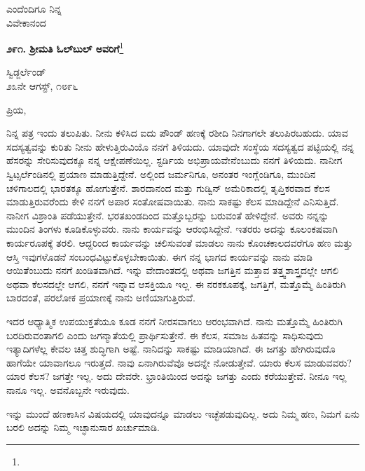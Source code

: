 \vspace{-0.4cm}

{\flushright
ಎಂದೆಂದಿಗೂ ನಿನ್ನ\\ವಿವೇಕಾನಂದ\par}

\begin{center}
\textbf{೨೯೧. ಶ‍್ರೀಮತಿ ಓಲ್‌ಬುಲ್‌ ಅವರಿಗೆ}\footnote{}
\end{center}

\vspace{-0.5cm}

\begin{flushright}
ಸ್ವಿಡ್ಜರ್ಲೆಂಡ್\\೨೩ನೇ ಆಗಸ್ಟ್, ೧೮೯೬
\end{flushright}

\noindent
ಪ್ರಿಯ,

ನಿನ್ನ ಪತ್ರ ಇಂದು ತಲುಪಿತು. ನೀನು ಕಳಿಸಿದ ಐದು ಪೌಂಡ್ ಹಣಕ್ಕೆ ರಶೀದಿ ನಿನಗಾಗಲೇ ತಲುಪಿರಬಹುದು. ಯಾವ ಸದಸ್ಯತ್ವವನ್ನು ಕುರಿತು ನೀನು ಹೇಳುತ್ತಿರುವಿಯೊ ನನಗೆ ತಿಳಿಯದು. ಯಾವುದೇ ಸಂಸ್ಥೆಯ ಸದಸ್ಯತ್ವದ ಪಟ್ಟಿಯಲ್ಲಿ ನನ್ನ ಹೆಸರನ್ನು ಸೇರಿಸುವುದಕ್ಕೂ ನನ್ನ ಆಕ್ಷೇಪಣೆಯಿಲ್ಲ. ಸ್ಟರ್ಡಿಯ ಅಭಿಪ್ರಾಯವೇನೆಂಬುದು ನನಗೆ ತಿಳಿಯದು. ನಾನೀಗ ಸ್ವಿಟ್ಸರ್ಲೆಂಡಿನಲ್ಲಿ ಪ್ರಯಾಣ ಮಾಡುತ್ತಿದ್ದೇನೆ. ಅಲ್ಲಿಂದ ಜರ್ಮನಿಗೂ, ಅನಂತರ ಇಂಗ್ಲೆಂಡಿಗೂ, ಮುಂದಿನ ಚಳಿಗಾಲದಲ್ಲಿ ಭಾರತಕ್ಕೂ ಹೋಗುತ್ತೇನೆ. ಶಾರದಾನಂದ ಮತ್ತು ಗುಡ್ವಿನ್ ಅಮೆರಿಕಾದಲ್ಲಿ ತೃಪ್ತಿಕರವಾದ ಕೆಲಸ ಮಾಡುತ್ತಿರುವರೆಂದು ಕೇಳಿ ನನಗೆ ಅಪಾರ ಸಂತೋಷವಾಯಿತು. ನಾನು ಸಾಕಷ್ಟು ಕೆಲಸ ಮಾಡಿದ್ದೇನೆ ಎನಿಸುತ್ತಿದೆ. ನಾನೀಗ ವಿಶ್ರಾಂತಿ ಪಡೆಯುತ್ತೇನೆ. ಭರತಖಂಡದಿಂದ ಮತ್ತೊಬ್ಬರನ್ನು ಬರುವಂತೆ ಹೇಳಿದ್ದೇನೆ. ಅವರು ನನ್ನನ್ನು ಮುಂದಿನ ತಿಂಗಳು ಕೂಡಿಕೊಳ್ಳುವರು. ನಾನು ಕಾರ್ಯವನ್ನು ಆರಂಭಿಸಿದ್ದೇನೆ. ಇತರರು ಅದನ್ನು ಕೂಲಂಕಷವಾಗಿ ಕಾರ್ಯರೂಪಕ್ಕೆ ತರಲಿ. ಆದ್ದರಿಂದ ಕಾರ್ಯವನ್ನು ಚಲಿಸುವಂತೆ ಮಾಡಲು ನಾನು ಕೊಂಚಕಾಲದವರೆಗೂ ಹಣ ಮತ್ತು ಆಸ್ತಿ ಇವುಗಳೊಡನೆ ಸಂಬಂಧವಿಟ್ಟುಕೊಳ್ಳಬೇಕಾಯಿತು. ಈಗ ನನ್ನ ಭಾಗದ ಕಾರ್ಯವನ್ನು ನಾನು ಮಾಡಿ ಆಯಿತೆಂಬುದು ನನಗೆ ಖಂಡಿತವಾಗಿದೆ. ಇನ್ನು ವೇದಾಂತದಲ್ಲಿ ಅಥವಾ ಜಗತ್ತಿನ ಮತ್ತಾವ ತತ್ತ್ವಶಾಸ್ತ್ರದಲ್ಲೇ ಆಗಲಿ ಅಥವಾ ಕೆಲಸದಲ್ಲೇ ಆಗಲಿ, ನನಗೆ ಇನ್ನಾವ ಆಸಕ್ತಿಯೂ ಇಲ್ಲ. ಈ ನರಕಕೂಪಕ್ಕೆ, ಜಗತ್ತಿಗೆ, ಮತ್ತೊಮ್ಮೆ ಹಿಂತಿರುಗಿ ಬಾರದಂತೆ, ಪರಲೋಕ ಪ್ರಯಾಣಕ್ಕೆ ನಾನು ಅಣಿಯಾಗುತ್ತಿರುವೆ.

ಇದರ ಆಧ್ಯಾತ್ಮಿಕ ಉಪಯುಕ್ತತೆಯೂ ಕೂಡ ನನಗೆ ನೀರಸವಾಗಲು ಆರಂಭವಾಗಿದೆ. ನಾನು ಮತ್ತೊಮ್ಮೆ ಹಿಂತಿರುಗಿ ಬರದಿರುವಂತಾಗಲಿ ಎಂದು ಜಗನ್ಮಾತೆಯಲ್ಲಿ ಪ್ರಾರ್ಥಿಸುತ್ತೇನೆ. ಈ ಕೆಲಸ, ಸಮಾಜ ಹಿತವನ್ನು ಸಾಧಿಸುವುದು ಇತ್ಯಾದಿಗಳೆಲ್ಲ ಕೇವಲ ಚಿತ್ತ ಶುದ್ಧಿಗಾಗಿ ಅಷ್ಟೆ. ನಾನಿದನ್ನು ಸಾಕಷ್ಟು ಮಾಡಿಯಾಗಿದೆ. ಈ ಜಗತ್ತು ಹೇಗಿರುವುದೊ ಹಾಗೆಯೇ ಯಾವಾಗಲೂ ಇರುತ್ತದೆ. ನಾವು ಏನಾಗಿರುವೆವೊ ಅದನ್ನೇ ನೋಡುತ್ತೇವೆ. ಯಾರು ಕೆಲಸ ಮಾಡುವವರು? ಯಾರ ಕೆಲಸ? ಜಗತ್ತೇ ಇಲ್ಲ. ಅದು ದೇವರೇ. ಭ್ರಾಂತಿಯಿಂದ ಅದನ್ನು ಜಗತ್ತು ಎಂದು ಕರೆಯುತ್ತೇವೆ. ನೀನೂ ಇಲ್ಲ ನಾನೂ ಇಲ್ಲ. ಅವನೊಬ್ಬನೇ ಇರುವುದು.

ಇನ್ನು ಮುಂದೆ ಹಣಕಾಸಿನ ವಿಷಯದಲ್ಲಿ ಯಾವುದನ್ನೂ ಮಾಡಲು ಇಚ್ಛೆಪಡುವುದಿಲ್ಲ. ಅದು ನಿಮ್ಮ ಹಣ, ನಿಮಗೆ ಏನು ಬರಲಿ ಅದನ್ನು ನಿಮ್ಮ ಇಚ್ಛಾನುಸಾರ ಖರ್ಚುಮಾಡಿ.

